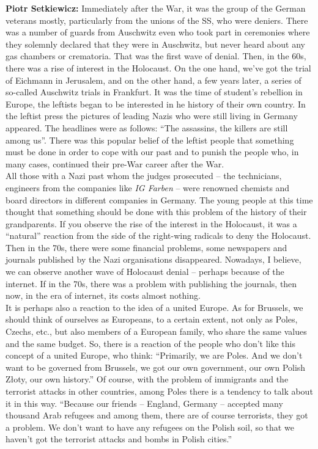 \textbf{Piotr Setkiewicz:} Immediately after the War, it was the group of the German veterans mostly, particularly from the unions of the SS, who were deniers. There was a number of guards from Auschwitz even who took part in ceremonies where they solemnly declared that they were in Auschwitz, but never heard about any gas chambers or crematoria. That was the first wave of denial. Then, in the 60s, there was a rise of interest in the Holocaust. On the one hand, we've got the trial of Eichmann in Jerusalem, and on the other hand, a few years later, a series of so-called Auschwitz trials in Frankfurt. It was the time of student’s rebellion in Europe, the leftists began to be interested in he history of their own country. In the leftist press the pictures of leading Nazis who were still living in Germany appeared. The headlines were as follows: ``The assassins, the killers are still among us''. There was this popular belief of the leftist people that something must be done in order to cope with our past and to punish the people who, in many cases, continued their pre-War career after the War.\\ 
All those with a Nazi past whom the judges prosecuted – the technicians, engineers from the companies like \textit{IG Farben} – were renowned chemists and board directors in different companies in Germany. The young people at this time thought that something should be done with this problem of the history of their grandparents. If you observe the rise of the interest in the Holocaust, it was a ``natural'' reaction from the side of the right-wing radicals to deny the Holocaust.\\
Then in the 70s, there were some financial problems, some newspapers and journals published by the Nazi organisations disappeared. Nowadays, I believe, we can observe another wave of Holocaust denial – perhaps because of the internet. If in the 70s, there was a problem with publishing the journals, then now, in the era of internet, its costs almost nothing.\\ 
It is perhaps also a reaction to the idea of a united Europe. As for Brussels, we should think of ourselves as Europeans, to a certain extent, not only as Poles, Czechs, etc., but also members of a European family, who share the same values and the same budget. So, there is a reaction of the people who don’t like this concept of a united Europe, who think: ``Primarily, we are Poles. And we don’t want to be governed from Brussels, we got our own government, our own Polish Złoty, our own history.'' Of course, with the problem of immigrants and the terrorist attacks in other countries, among Poles there is a tendency to talk about it in this way. ``Because our friends – England, Germany – accepted many thousand Arab refugees and among them, there are of course terrorists, they got a problem. We don’t want to have any refugees on the Polish soil, so that we haven’t got the terrorist attacks and bombs in Polish cities.''

